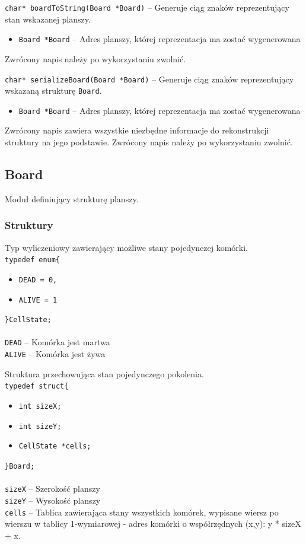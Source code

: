 \documentclass{mwart}
\begin{document}
\vspace{5mm}
\noindent{}\texttt{char* boardToString(Board *Board)} -- Generuje ciąg znaków reprezentujący stan wskazanej planszy.
\begin{itemize}[label={}]
	\item \texttt{Board *Board} -- Adres planszy, której reprezentacja ma zostać wygenerowana
\end{itemize}
Zwrócony napis należy po wykorzystaniu zwolnić.

\vspace{5mm}
\noindent{}\texttt{char* serializeBoard(Board *Board)} -- Generuje ciąg znaków reprezentujący wskazaną strukturę \texttt{Board}.
\begin{itemize}[label={}]
	\item \texttt{Board *Board} -- Adres planszy, której reprezentacja ma zostać wygenerowana
\end{itemize}
Zwrócony napis zawiera wszystkie niezbędne informacje do rekonstrukcji struktury na jego podstawie. Zwrócony napis należy po wykorzystaniu zwolnić.

\subsection{Board}
Moduł definiujący strukturę planszy.

\subsubsection{Struktury}
Typ wyliczeniowy zawierający możliwe stany pojedynczej komórki. \\
\texttt{typedef enum\{}
\begin{itemize}[label={}, noitemsep, topsep=0pt]
	\item \texttt{DEAD = 0,}
	\item \texttt{ALIVE = 1}
\end{itemize}
\texttt{\}CellState;}\\\\
\texttt{DEAD} -- Komórka jest martwa \\
\texttt{ALIVE} -- Komórka jest żywa

\vspace{5mm}

\noindent{}Struktura przechowująca stan pojedynczego pokolenia. \\
\texttt{typedef struct\{}
\begin{itemize}[label={}, noitemsep, topsep=0pt]
	\item \texttt{int sizeX;}
	\item \texttt{int sizeY;}
	\item \texttt{CellState *cells;}
\end{itemize}
\texttt{\}Board;\\} \\
\texttt{sizeX} -- Szerokość planszy \\
\texttt{sizeY} -- Wysokość planszy \\
\texttt{cells} -- Tablica zawierająca stany wszystkich komórek, wypisane wiersz po wierszu w tablicy 1-wymiarowej - adres komórki o współrzędnych (x,y): y * sizeX + x.
\end{document}
